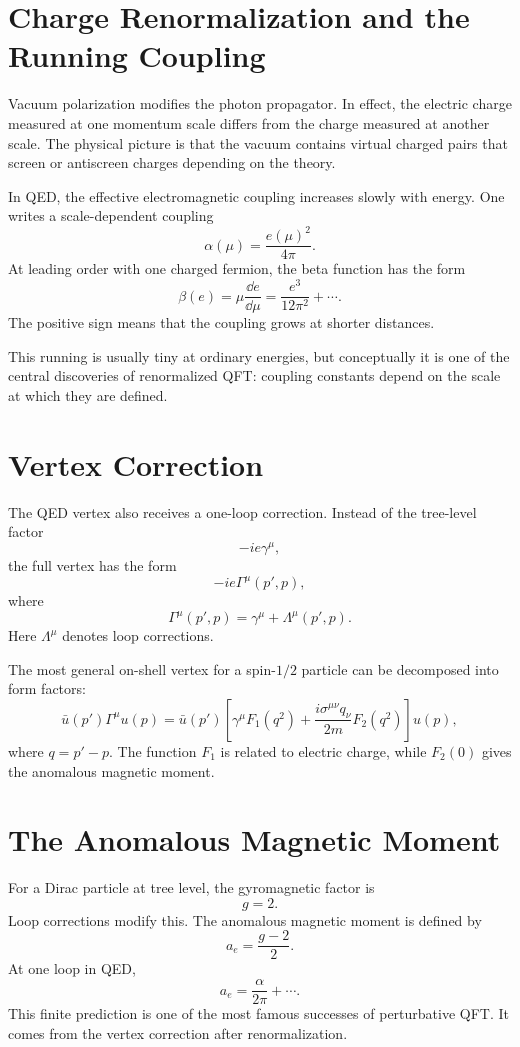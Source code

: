 \section{Charge Renormalization and the Running Coupling}

Vacuum polarization modifies the photon propagator. In effect, the electric
charge measured at one momentum scale differs from the charge measured at
another scale. The physical picture is that the vacuum contains virtual charged
pairs that screen or antiscreen charges depending on the theory.

In QED, the effective electromagnetic coupling increases slowly with energy. One
writes a scale-dependent coupling
\[
    \alpha(\mu)=\frac{e(\mu)^2}{4\pi}.
\]
At leading order with one charged fermion, the beta function has the form
\[
    \beta(e)=\mu\frac{\dd e}{\dd\mu}
    = \frac{e^3}{12\pi^2}+\cdots.
\]
The positive sign means that the coupling grows at shorter distances.

This running is usually tiny at ordinary energies, but conceptually it is one of
the central discoveries of renormalized QFT: coupling constants depend on the
scale at which they are defined.

\section{Vertex Correction}

The QED vertex also receives a one-loop correction. Instead of the tree-level
factor
\[
    -ie\gamma^\mu,
\]
the full vertex has the form
\[
    -ie\Gamma^\mu(p',p),
\]
where
\[
    \Gamma^\mu(p',p)=\gamma^\mu+\Lambda^\mu(p',p).
\]
Here \(\Lambda^\mu\) denotes loop corrections.

The most general on-shell vertex for a spin-\(1/2\) particle can be decomposed
into form factors:
\[
    \bar u(p')\Gamma^\mu u(p)
    = \bar u(p')\left[
      \gamma^\mu F_1(q^2)
      +\frac{i\sigma^{\mu\nu}q_\nu}{2m}F_2(q^2)
      \right]u(p),
\]
where \(q=p'-p\). The function \(F_1\) is related to electric charge, while
\(F_2(0)\) gives the anomalous magnetic moment.

\section{The Anomalous Magnetic Moment}

For a Dirac particle at tree level, the gyromagnetic factor is
\[
    g=2.
\]
Loop corrections modify this. The anomalous magnetic moment is defined by
\[
    a_e=\frac{g-2}{2}.
\]
At one loop in QED,
\[
    a_e=\frac{\alpha}{2\pi}+\cdots.
\]
This finite prediction is one of the most famous successes of perturbative QFT.
It comes from the vertex correction after renormalization.

